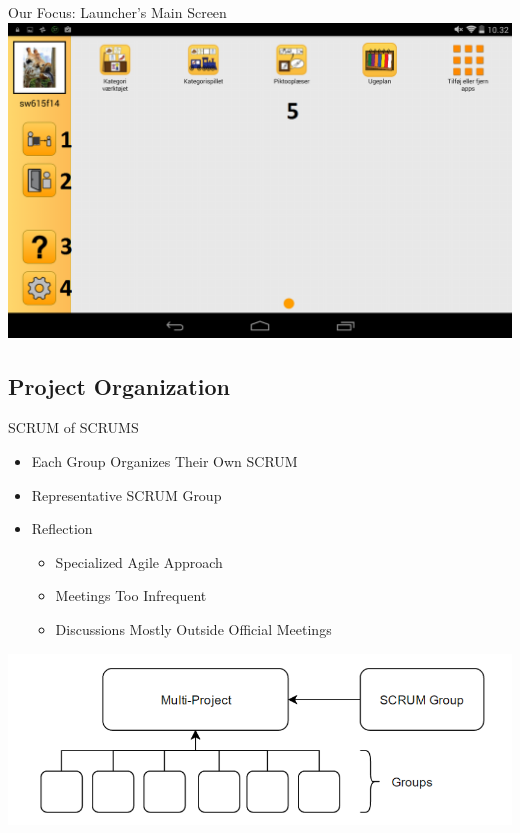 \begin{frame}{Our Focus: Launcher's Main Screen}
\includegraphics[scale=0.28]{figures/MenuGuardian.png} 
\end{frame}

\subsection{Project Organization}
\begin{frame}{SCRUM of SCRUMS}
\begin{itemize} 
	\item Each Group Organizes Their Own SCRUM
	\item Representative SCRUM Group
	\item Reflection
		\begin{itemize}
		    \item Specialized Agile Approach
		    \item Meetings Too Infrequent
		    \item Discussions Mostly Outside Official Meetings
		\end{itemize}
\end{itemize}
\includegraphics[scale=0.42]{figures/SoS.png} 
\end{frame}

